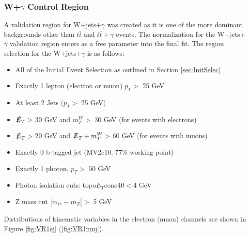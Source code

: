 \subsubsection{W+$\gamma$ Control Region}
A validation region for W+jets+$\gamma$ was created as it is one of the more dominant backgrounds other than $t\bar{t}$ and $t\bar{t}+\gamma$ events.  The normalization for the W+jets+$\gamma$ validation region enters as a free parameter into the final fit. The region selection for the W+jets+$\gamma$ is as follows:
\begin{itemize}
\item All of the Initial Event Selection as outlined in Section \ref{sec:InitSelec}
\item Exactly 1 lepton (electron or muon) $p_T >$ 25 GeV
\item At least 2 Jets  ($p_T >$ 25 GeV) 
\item $\slashed{E}_T >$ 30 GeV and $m_T^W >$ 30 GeV (for events with electrons)
\item $\slashed{E}_T >$ 20 GeV and $\slashed{E}_T + m_T^W >$ 60 GeV (for events with muons)
\item Exactly 0 b-tagged jet (MV2c10, 77\% working point)
\item Exactly 1 photon, $p_T >$ 50 GeV
\item Photon isolation cuts: topo$E_T$cone40$<$4 GeV
\item Z mass cut $|m_{l\gamma}-m_Z|>$ 5 GeV
\end{itemize}

Distributions of kinematic variables in the electron (muon) channels are shown in Figure \ref{fig:VR1ej} (\ref{fig:VR1muj}).

